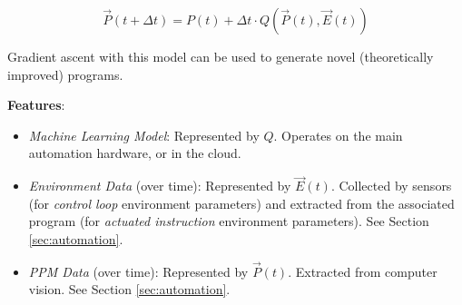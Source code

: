 $$\vec P(t+\Delta t)=P(t)+\Delta t\cdot Q(\vec P(t),\vec E(t))$$

Gradient ascent with this model can be used to generate novel (theoretically improved) programs.

\textbf{Features}:
\begin{itemize}
    \item \textit{Machine Learning Model}: Represented by $Q$. Operates on the main automation hardware, or in the cloud.
    \item \textit{Environment Data} (over time): Represented by $\vec E(t)$. Collected by sensors (for \textit{control loop} environment parameters) and extracted from the associated program (for \textit{actuated instruction} environment parameters). See Section \ref{sec:automation}.
    \item \textit{PPM Data} (over time): Represented by $\vec P(t)$. Extracted from computer vision. See Section \ref{sec:automation}.
\end{itemize}